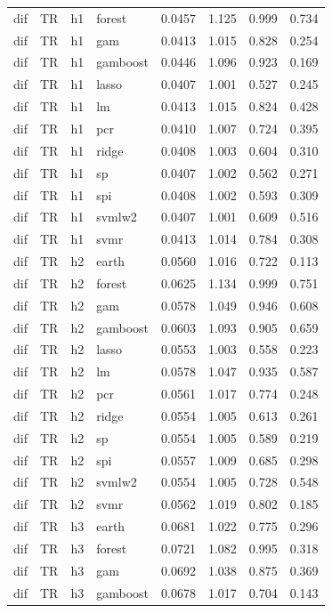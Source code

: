 \begin{ThreePartTable}
\begin{longtable}[t]{llclcccc}
dif & TR & h1 & forest & 0.0457 & 1.125 & 0.999 & 0.734\\
dif & TR & h1 & gam & 0.0413 & 1.015 & 0.828 & 0.254\\
dif & TR & h1 & gamboost & 0.0446 & 1.096 & 0.923 & 0.169\\
dif & TR & h1 & lasso & 0.0407 & 1.001 & 0.527 & 0.245\\
dif & TR & h1 & lm & 0.0413 & 1.015 & 0.824 & 0.428\\
dif & TR & h1 & pcr & 0.0410 & 1.007 & 0.724 & 0.395\\
dif & TR & h1 & ridge & 0.0408 & 1.003 & 0.604 & 0.310\\
dif & TR & h1 & sp & 0.0407 & 1.002 & 0.562 & 0.271\\
dif & TR & h1 & spi & 0.0408 & 1.002 & 0.593 & 0.309\\
dif & TR & h1 & svmlw2 & 0.0407 & 1.001 & 0.609 & 0.516\\
dif & TR & h1 & svmr & 0.0413 & 1.014 & 0.784 & 0.308\\
\addlinespace
dif & TR & h2 & earth & 0.0560 & 1.016 & 0.722 & 0.113\\
dif & TR & h2 & forest & 0.0625 & 1.134 & 0.999 & 0.751\\
dif & TR & h2 & gam & 0.0578 & 1.049 & 0.946 & 0.608\\
dif & TR & h2 & gamboost & 0.0603 & 1.093 & 0.905 & 0.659\\
dif & TR & h2 & lasso & 0.0553 & 1.003 & 0.558 & 0.223\\
dif & TR & h2 & lm & 0.0578 & 1.047 & 0.935 & 0.587\\
dif & TR & h2 & pcr & 0.0561 & 1.017 & 0.774 & 0.248\\
dif & TR & h2 & ridge & 0.0554 & 1.005 & 0.613 & 0.261\\
dif & TR & h2 & sp & 0.0554 & 1.005 & 0.589 & 0.219\\
dif & TR & h2 & spi & 0.0557 & 1.009 & 0.685 & 0.298\\
dif & TR & h2 & svmlw2 & 0.0554 & 1.005 & 0.728 & 0.548\\
dif & TR & h2 & svmr & 0.0562 & 1.019 & 0.802 & 0.185\\
\addlinespace
dif & TR & h3 & earth & 0.0681 & 1.022 & 0.775 & 0.296\\
dif & TR & h3 & forest & 0.0721 & 1.082 & 0.995 & 0.318\\
dif & TR & h3 & gam & 0.0692 & 1.038 & 0.875 & 0.369\\
dif & TR & h3 & gamboost & 0.0678 & 1.017 & 0.704 & 0.143\\

\end{longtable}
\end{ThreePartTable}
